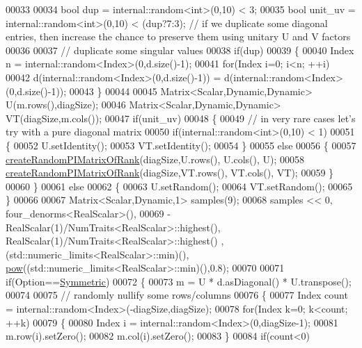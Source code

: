 \begin{DoxyCode}
00033 
00034   \textcolor{keywordtype}{bool} dup     = internal::random<int>(0,10) < 3;
00035   \textcolor{keywordtype}{bool} unit\_uv = internal::random<int>(0,10) < (dup?7:3); \textcolor{comment}{// if we duplicate some diagonal entries, then
       increase the chance to preserve them using unitary U and V factors}
00036   
00037   \textcolor{comment}{// duplicate some singular values}
00038   \textcolor{keywordflow}{if}(dup)
00039   \{
00040     Index n = internal::random<Index>(0,d.size()-1);
00041     \textcolor{keywordflow}{for}(Index i=0; i<n; ++i)
00042       d(internal::random<Index>(0,d.size()-1)) = d(internal::random<Index>(0,d.size()-1));
00043   \}
00044   
00045   Matrix<Scalar,Dynamic,Dynamic> U(m.rows(),diagSize);
00046   Matrix<Scalar,Dynamic,Dynamic> VT(diagSize,m.cols());
00047   \textcolor{keywordflow}{if}(unit\_uv)
00048   \{
00049     \textcolor{comment}{// in very rare cases let's try with a pure diagonal matrix}
00050     \textcolor{keywordflow}{if}(internal::random<int>(0,10) < 1)
00051     \{
00052       U.setIdentity();
00053       VT.setIdentity();
00054     \}
00055     \textcolor{keywordflow}{else}
00056     \{
00057       \hyperlink{namespace_eigen_a0d9a7ddcee5c7c8defaba3628455efb2}{createRandomPIMatrixOfRank}(diagSize,U.rows(), U.cols(), U);
00058       \hyperlink{namespace_eigen_a0d9a7ddcee5c7c8defaba3628455efb2}{createRandomPIMatrixOfRank}(diagSize,VT.rows(), VT.cols(), VT);
00059     \}
00060   \}
00061   \textcolor{keywordflow}{else}
00062   \{
00063     U.setRandom();
00064     VT.setRandom();
00065   \}
00066   
00067   Matrix<Scalar,Dynamic,1> samples(9);
00068   samples << 0, four\_denorms<RealScalar>(),
00069             -RealScalar(1)/NumTraits<RealScalar>::highest(), RealScalar(1)/NumTraits<RealScalar>::highest()
      , (std::numeric\_limits<RealScalar>::min)(), \hyperlink{group___core___module_ab6dc101d82e8228a19a8840e3a29c1c9}{pow}((std::numeric\_limits<RealScalar>::min)(),0.8);
00070   
00071   \textcolor{keywordflow}{if}(Option==\hyperlink{group__enums_gga39e3366ff5554d731e7dc8bb642f83cda7d30fb969ef6b763c098f0015108cef4}{Symmetric})
00072   \{
00073     m = U * d.asDiagonal() * U.transpose();
00074     
00075     \textcolor{comment}{// randomly nullify some rows/columns}
00076     \{
00077       Index count = internal::random<Index>(-diagSize,diagSize);
00078       \textcolor{keywordflow}{for}(Index k=0; k<count; ++k)
00079       \{
00080         Index i = internal::random<Index>(0,diagSize-1);
00081         m.row(i).setZero();
00082         m.col(i).setZero();
00083       \}
00084       \textcolor{keywordflow}{if}(count<0)

\end{DoxyCode}
